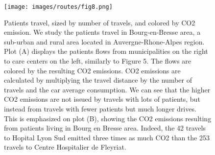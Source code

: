 \begin{figure}[h]
    \texttt{[image: images/routes/fig8.png]}
    \centering
    \caption{
        Patients travel, sized by number of travels, and colored by CO2 emission. We study the patients travel in Bourg-en-Bresse area, a sub-urban and rural area located in Auvergne-Rhone-Alpes region. Plot (A) displays the patients flows from municipalities on the right to care centers on the left, similarly to Figure 5. The flows are colored by the resulting CO2 emissions. CO2 emissions are calculated by multiplying the travel distance by the number of travels and the car average consumption. We can see that the higher CO2 emissions are not issued by travels with lots of patients, but instead from travels with fewer patients but much longer drives. This is emphasized on plot (B), showing the CO2 emissions resulting from patients living in Bourg en Bresse area. Indeed, the 42 travels to Hopital Lyon Sud emitted three times as much CO2 than the 253 travels to Centre Hospitalier de Fleyriat.
    }
    \label{fig:routes-co2-01}
\end{figure}
